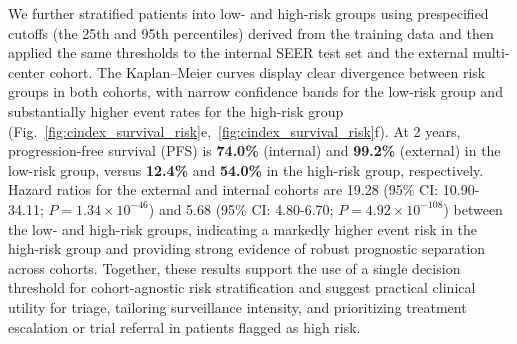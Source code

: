 \documentclass{article}
\begin{document}
We further stratified patients into low- and high-risk groups using prespecified cutoffs (the 25th and 95th percentiles) derived from the training data and then applied the same thresholds to the internal SEER test set and the external multi-center cohort. The Kaplan–Meier curves display clear divergence between risk groups in both cohorts, with narrow confidence bands for the low-risk group and substantially higher event rates for the high-risk group (Fig.~\ref{fig:cindex_survival_risk}e,~\ref{fig:cindex_survival_risk}f). At 2 years, progression-free survival (PFS) is \textbf{74.0\%} (internal) and \textbf{99.2\%} (external) in the low-risk group, versus \textbf{12.4\%} and \textbf{54.0\%} in the high-risk group, respectively. Hazard ratios for the external and internal cohorts are 19.28 (95\% CI: 10.90-34.11; $P =1.34 \times 10^{-46}$) and 5.68 (95\% CI: 4.80-6.70; $P = 4.92 \times 10^{-108}$) between the low- and high-risk groups, indicating a markedly higher event risk in the high-risk group and providing strong evidence of robust prognostic separation across cohorts. Together, these results support the use of a single decision threshold for cohort-agnostic risk stratification and suggest practical clinical utility for triage, tailoring surveillance intensity, and prioritizing treatment escalation or trial referral in patients flagged as high risk.


\FloatBarrier
\end{document}
